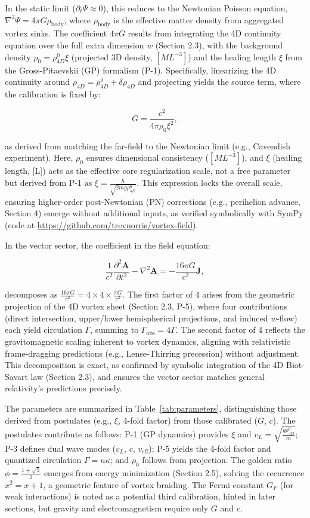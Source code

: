 In the static limit ($\partial_t \Psi \approx 0$), this reduces to the Newtonian Poisson equation, $\nabla^2 \Psi = 4\pi G \rho_{\text{body}}$, where $\rho_{\text{body}}$ is the effective matter density from aggregated vortex sinks. The coefficient $4\pi G$ results from integrating the 4D continuity equation over the full extra dimension $w$ (Section 2.3), with the background density $\rho_0 = \rho_{4D}^0 \xi$ (projected 3D density, $[M L^{-3}]$) and the healing length $\xi$ from the Gross-Pitaevskii (GP) formalism (P-1). Specifically, linearizing the 4D continuity around $\rho_{4D} = \rho_{4D}^0 + \delta \rho_{4D}$ and projecting yields the source term, where the calibration is fixed by:

\[
G = \frac{c^2}{4\pi \rho_0 \xi^2},
\]

as derived from matching the far-field to the Newtonian limit (e.g., Cavendish experiment). Here, $\rho_0$ ensures dimensional consistency ($[M L^{-3}]$), and $\xi$ (healing length, [L]) acts as the effective core regularization scale, not a free parameter but derived from P-1 as $\xi = \frac{\hbar}{\sqrt{2 m g \rho_{4D}^0}}$. This expression locks the overall scale, ensuring higher-order post-Newtonian (PN) corrections (e.g., perihelion advance, Section 4) emerge without additional inputs, as verified symbolically with SymPy (code at \url{https://github.com/trevnorris/vortex-field}).

In the vector sector, the coefficient in the field equation:

\[
\frac{1}{c^2} \frac{\partial^2 \mathbf{A}}{\partial t^2} - \nabla^2 \mathbf{A} = -\frac{16\pi G}{c^2} \mathbf{J},
\]

decomposes as $\frac{16\pi G}{c^2} = 4 \times 4 \times \frac{\pi G}{c^2}$. The first factor of 4 arises from the geometric projection of the 4D vortex sheet (Section 2.3, P-5), where four contributions (direct intersection, upper/lower hemispherical projections, and induced $w$-flow) each yield circulation $\Gamma$, summing to $\Gamma_{\text{obs}} = 4\Gamma$. The second factor of 4 reflects the gravitomagnetic scaling inherent to vortex dynamics, aligning with relativistic frame-dragging predictions (e.g., Lense-Thirring precession) without adjustment. This decomposition is exact, as confirmed by symbolic integration of the 4D Biot-Savart law (Section 2.3), and ensures the vector sector matches general relativity's predictions precisely.

The parameters are summarized in Table~\ref{tab:parameters}, distinguishing those derived from postulates (e.g., $\xi$, 4-fold factor) from those calibrated ($G$, $c$). The postulates contribute as follows: P-1 (GP dynamics) provides $\xi$ and $v_L = \sqrt{\frac{g \rho_{4D}^0}{m}}$; P-3 defines dual wave modes ($v_L$, $c$, $v_{\text{eff}}$); P-5 yields the 4-fold factor and quantized circulation $\Gamma = n \kappa$; and $\rho_0$ follows from projection. The golden ratio $\phi = \frac{1 + \sqrt{5}}{2}$ emerges from energy minimization (Section 2.5), solving the recurrence $x^2 = x + 1$, a geometric feature of vortex braiding. The Fermi constant $G_F$ (for weak interactions) is noted as a potential third calibration, hinted in later sections, but gravity and electromagnetism require only $G$ and $c$.

